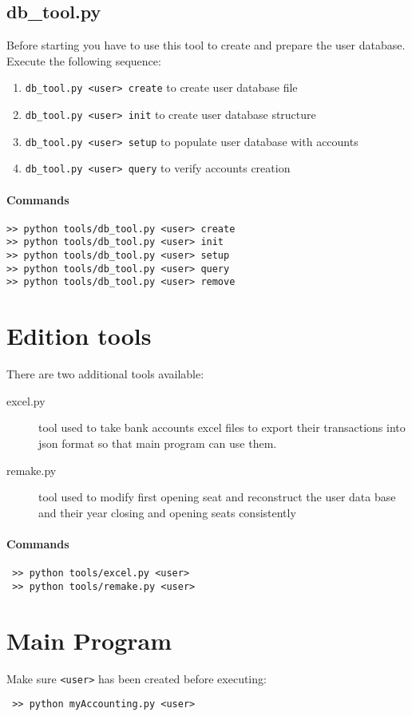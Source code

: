 \documentclass[12pt, a4paper]{article}
\begin{document}
 \subsection{db\_tool.py}
 Before starting you have to use this tool to create and prepare the user database. 
 Execute the following sequence:
 \begin{enumerate}[wide, labelwidth=!, labelindent=0pt]
 \item \verb!db_tool.py <user> create! to create user database file
 \item \verb!db_tool.py <user> init! to create user database structure		
 \item \verb!db_tool.py <user> setup!	 to populate user database with accounts
 \item \verb!db_tool.py <user> query! to verify accounts creation
\end{enumerate}
\paragraph{Commands}
\begin{verbatim}
>> python tools/db_tool.py <user> create
>> python tools/db_tool.py <user> init
>> python tools/db_tool.py <user> setup
>> python tools/db_tool.py <user> query
>> python tools/db_tool.py <user> remove
\end{verbatim}
 \section{Edition tools}
 There are two additional tools available: 
 \begin{description}
 \item[excel.py] tool used to take bank accounts excel files to export their transactions into json format so that main program can use them. 
 \item[remake.py] tool used to modify first opening seat and reconstruct the user data base and their year closing and opening seats consistently 
 \end{description}
 \paragraph{Commands}
 \begin{verbatim}
 >> python tools/excel.py <user>
 >> python tools/remake.py <user>
 \end{verbatim}
  
  \section{Main Program}
 Make sure \verb!<user>! has been created before 
 executing:
 \begin{verbatim}
 >> python myAccounting.py <user>
 \end{verbatim}
\end{document}
